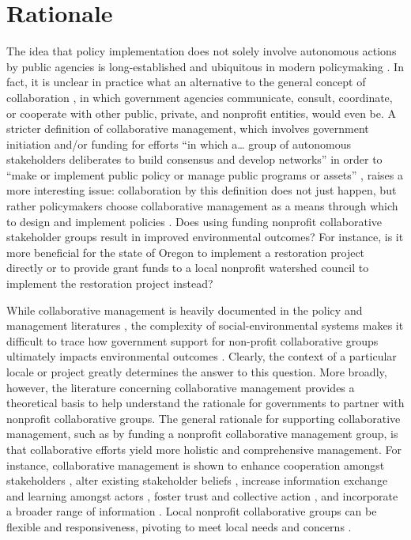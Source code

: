 \documentclass[11pt,a4paper,titlepage]{article}
\begin{document}
\section*{Rationale}

The idea that policy implementation does not solely involve autonomous actions by public agencies is long-established \parencite[e.g.,][]{ostrom1961} and ubiquitous in modern policymaking \parencite[][p. 8]{salamon2002}. In fact, it is unclear in practice what an alternative to the general concept of collaboration \parencite{donahue2011,agranoff2003}, in which government agencies communicate, consult, coordinate, or cooperate with other public, private, and nonprofit entities, would even be. A stricter definition of collaborative management, which involves government initiation and/or funding \parencite{ansell2008} for efforts “in which a… group of autonomous stakeholders deliberates to build consensus and develop networks” \parencite[p. 6]{margerum2011} in order to “make or implement public policy or manage public programs or assets” \parencite[p. 544]{ansell2008}, raises a more interesting issue: collaboration by this definition does not just happen, but rather policymakers choose collaborative management as a means through which to design and implement policies \parencite{layzer2008, hoornbeek2012, koontz2004}. Does using funding nonprofit collaborative stakeholder groups result in improved environmental outcomes? For instance, is it more beneficial for the state of Oregon to implement a restoration project directly or to provide grant funds to a local nonprofit watershed council to implement the restoration project instead? 
 
While collaborative management is heavily documented in the policy and management literatures \parencite{emerson2012,margerum2011,sabatier2005,ansell2008,lubell2004}, the complexity of social-environmental systems makes it difficult to trace how government support for non-profit collaborative groups ultimately impacts environmental outcomes \parencite{koontz2006, thomas2011}. Clearly, the context of a particular locale or project greatly determines the answer to this question. More broadly, however, the literature concerning collaborative management provides a theoretical basis to help understand the rationale for governments to partner with nonprofit collaborative groups. The general rationale for supporting collaborative management, such as by funding a nonprofit collaborative management group, is that collaborative efforts yield more holistic and comprehensive management. For instance, collaborative management is shown to enhance cooperation amongst stakeholders \parencite{lubell2004}, alter existing stakeholder beliefs \parencite{leach2013}, increase information exchange and learning amongst actors \parencite{beierle2002,weible2009}, foster trust and collective action \parencite{lubell2005}, and incorporate a broader range of information \parencite{innes1999,wondolleck2000}. Local nonprofit collaborative groups can be flexible and responsiveness, pivoting to meet local needs and concerns \parencite{nikolic2008}.
\end{document}
